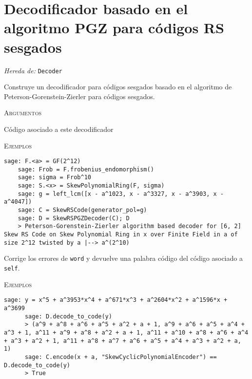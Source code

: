 \section{Decodificador basado en el algoritmo PGZ para códigos RS sesgados}

\begin{description}[leftmargin=1em, font=\normalfont\ttfamily, style=nextline]
  \item[class SkewRSPGZDecoder(self, code)]
  
  \emph{Hereda de:} \texttt{Decoder}

  Construye un decodificador para códigos  sesgados basado en el algoritmo de Peterson-Gorenstein-Zierler para códigos  sesgados.

  \textsc{Argumentos}
  \begin{description}[font=\normalfont\ttfamily]
    \item[code] Código asociado a este decodificador
  \end{description}

  \textsc{Ejemplos}
  \begin{lstlisting}[gobble=4]
    sage: F.<a> = GF(2^12)
    sage: Frob = F.frobenius_endomorphism()
    sage: sigma = Frob^10
    sage: S.<x> = SkewPolynomialRing(F, sigma)
    sage: g = left_lcm([x - a^1023, x - a^3327, x - a^3903, x - a^4047])
    sage: C = SkewRSCode(generator_pol=g)
    sage: D = SkewRSPGZDecoder(C); D
    > Peterson-Gorenstein-Zierler algorithm based decoder for [6, 2] Skew RS Code on Skew Polynomial Ring in x over Finite Field in a of size 2^12 twisted by a |--> a^(2^10)
  \end{lstlisting}

  \begin{description}[font=\ttfamily, style=nextline]
    \item[decode\_to\_code(self, word)] Corrige los errores de \texttt{word} y devuelve una palabra código del código asociado a \texttt{self}.
    
    \textsc{Ejemplos}
    \begin{lstlisting}[gobble=6]
      sage: y = x^5 + a^3953*x^4 + a^671*x^3 + a^2604*x^2 + a^1596*x + a^3699
      sage: D.decode_to_code(y)
      > (a^9 + a^8 + a^6 + a^5 + a^2 + a + 1, a^9 + a^6 + a^5 + a^4 + a^3 + 1, a^11 + a^9 + a^8 + a^2 + a + 1, a^11 + a^10 + a^8 + a^6 + a^4 + a^3 + a^2 + 1, a^11 + a^8 + a^7 + a^6 + a^5 + a^4 + a^3 + a^2 + a, 1)
      sage: C.encode(x + a, "SkewCyclicPolynomialEncoder") == D.decode_to_code(y)
      > True
    \end{lstlisting}
  
  \end{description}
\end{description}

